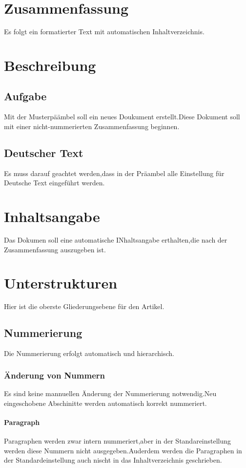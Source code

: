 \documentclass{scrartcl}
\begin{document}
\section*{Zusammenfassung}
Es folgt ein formatierter Text mit automatischen Inhaltverzeichnis.



\tableofcontents

\section{Beschreibung}
\subsection{Aufgabe}
Mit der Musterpäämbel soll ein neues Doukument  erstellt.Diese Dokument soll mit einer nicht-nummerierten Zusammenfassung beginnen.
\subsection{Deutscher Text}
Es muss darauf geachtet werden,dass in der Präambel  alle Einstellung für Deutsche Text eingeführt werden.
\section{Inhaltsangabe}
Das Dokumen soll eine automatische INhaltsangabe erthalten,die nach der Zusammenfassung auszugeben ist.
\section{Unterstrukturen}
Hier ist die oberste Gliederungsebene für den Artikel.
\subsection{Nummerierung}
Die Nummerierung erfolgt automatisch und hierarchisch.
\subsubsection{Änderung von Nummern}
Es sind keine mannuellen Änderung der Nummerierung notwendig.Neu eingeschobene Abschinitte werden automatisch korrekt nummeriert.
\paragraph{Paragraph} Paragraphen werden zwar intern nummeriert,aber in der Standareinstellung werden diese Nummern nicht ausgegeben.Auderdem werden die Paragraphen in der Standardeinstellung auch nischt in das Inhaltverzeichnis geschrieben.
\end{document}
